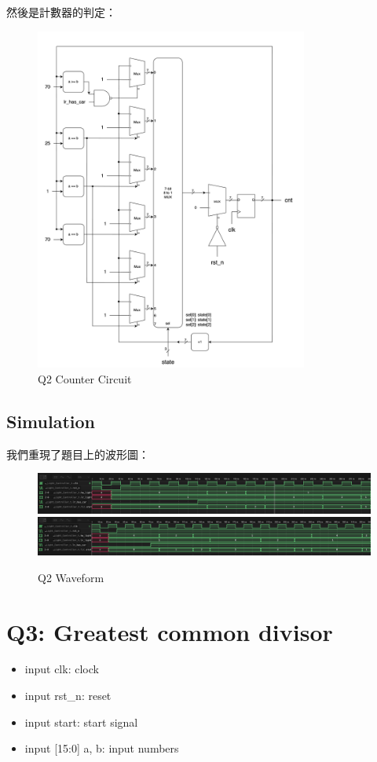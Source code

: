 \documentclass[10.5pt,compsoc,UTF8]{CjC}
\theoremstyle{mystyle}
\begin{document}
然後是計數器的判定：
\begin{figure}[h!]
  \centering
  \includegraphics[width=0.8\textwidth]{./img/Q2-cnt-circuit.png}
  \caption{Q2 Counter Circuit}
  \label{fig:Q2-counter}
\end{figure}
\newpage

\subsection{Simulation}
我們重現了題目上的波形圖：

\begin{figure}[h!]
  \centering
  \includegraphics[width=\textwidth]{./img/Q2-tb1.png}
  \includegraphics[width=\textwidth]{./img/Q2-tb2.png}
  \caption{Q2 Waveform}
  \label{fig:Q2-waveform}
\end{figure}


\section{Q3: Greatest common divisor}
\begin{itemize}
  \item input clk: clock
  \item input rst\_n: reset
  \item input start: start signal
  \item input [15:0] a, b: input numbers
\end{itemize}
\end{document}
